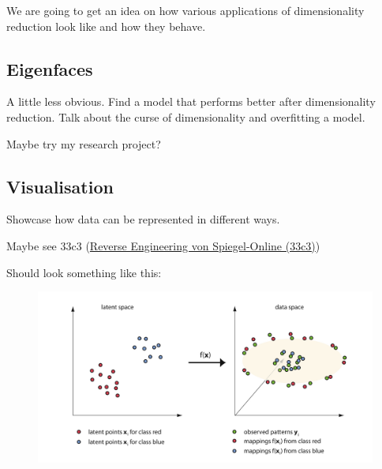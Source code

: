 We are going to get an idea on how various applications of dimensionality reduction look like and how they behave.







\subsection{Eigenfaces}

A little less obvious.
Find a model that performs better after dimensionality reduction.
Talk about the curse of dimensionality and overfitting a model.

Maybe try my research project?

\clearpage





\subsection{Visualisation}

Showcase how data can be represented in different ways.

Maybe see 33c3 (\href{https://www.youtube.com/watch?v=-YpwsdRKt8Q}{Reverse Engineering von Spiegel-Online (33c3)})

Should look something like this:

\begin{figure}[h]
  \centering
  \includegraphics[width=0.9\linewidth]{external_content/graphs/latent_space_reduction_example.png}
  \captionsetup{justification=centering}
  \label{fig:visualisingReduction}
\end{figure}


\clearpage


